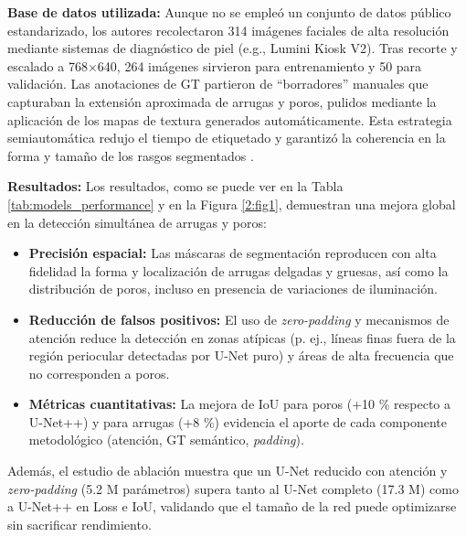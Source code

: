 \textbf{Base de datos utilizada:}
Aunque no se empleó un conjunto de datos público estandarizado, los autores recolectaron 314 imágenes faciales de alta resolución mediante sistemas de diagnóstico de piel (e.g., Lumini Kiosk V2). Tras recorte y escalado a 768×640, 264 imágenes sirvieron para entrenamiento y 50 para validación. Las anotaciones de GT partieron de “borradores” manuales que capturaban la extensión aproximada de arrugas y poros, pulidos mediante la aplicación de los mapas de textura generados automáticamente. Esta estrategia semiautomática redujo el tiempo de etiquetado y garantizó la coherencia en la forma y tamaño de los rasgos segmentados .

\textbf{Resultados:}
Los resultados, como se puede ver en la Tabla \ref{tab:models_performance} y en la Figura \ref{2:fig1}, demuestran una mejora global en la detección simultánea de arrugas y poros:

\begin{itemize}
    \item \textbf{Precisión espacial:} Las máscaras de segmentación reproducen con alta fidelidad la forma y localización de arrugas delgadas y gruesas, así como la distribución de poros, incluso en presencia de variaciones de iluminación.
    \item \textbf{Reducción de falsos positivos:} El uso de \textit{zero-padding} y mecanismos de atención reduce la detección en zonas atípicas (p. ej., líneas finas fuera de la región periocular detectadas por U-Net puro) y áreas de alta frecuencia que no corresponden a poros.
    \item \textbf{Métricas cuantitativas:} La mejora de IoU para poros (+10 \% respecto a U-Net++) y para arrugas (+8 \%) evidencia el aporte de cada componente metodológico (atención, GT semántico, \textit{padding}).
\end{itemize}

Además, el estudio de ablación muestra que un U-Net reducido con atención y \textit{zero-padding} (5.2 M parámetros) supera tanto al U-Net completo (17.3 M) como a U-Net++ en Loss e IoU, validando que el tamaño de la red puede optimizarse sin sacrificar rendimiento.


